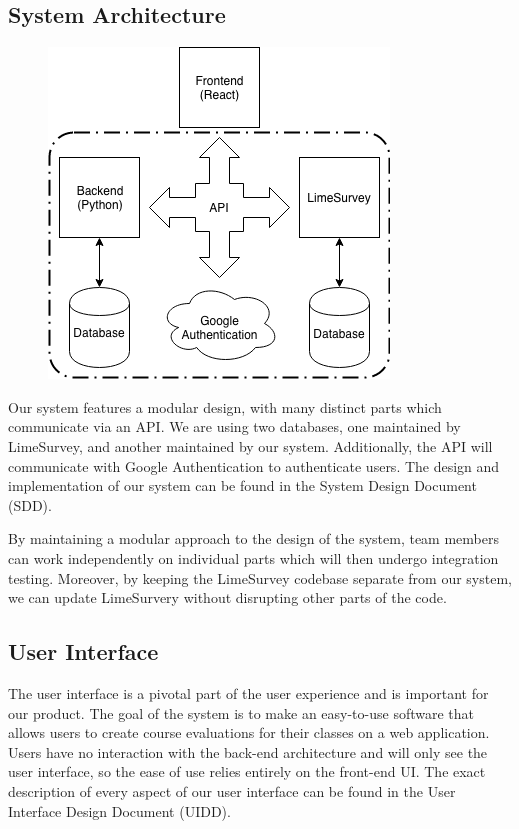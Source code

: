 \documentclass{article}
\begin{document}
\subsection{System Architecture}

\begin{center}
\begin{figure}[H]
\centering
{}
\vspace{2mm}
\label{fig:componentdiagram}
{\includegraphics[scale=.75]{images/component_diagram.png}}
\end{figure}
\end{center}

Our system features a modular design, with many distinct parts which communicate via an API. We are using two databases, one maintained by LimeSurvey, and another maintained by our system. Additionally, the API will communicate with Google Authentication to authenticate users. The design and implementation of our system can be found in the System Design Document (SDD). 

By maintaining a modular approach to the design of the system, team members can work independently on individual parts which will then undergo integration testing. Moreover, by keeping the LimeSurvey codebase separate from our system, we can update LimeSurvery without disrupting other parts of the code. 

\subsection{User Interface}
The user interface is a pivotal part of the user experience and is important for our product. The goal of the system is to make an easy-to-use software that allows users to create course evaluations for their classes on a web application.  Users have no interaction with the back-end architecture and will only see the user interface, so the ease of use relies entirely on the front-end UI.  The exact description of every aspect of our user interface can be found in the User Interface Design Document (UIDD). 
\end{document}
